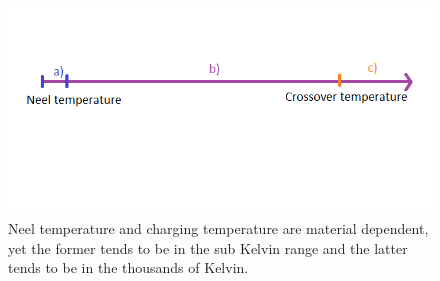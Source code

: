 \begin{figure}[htbp]
\begin{center}
\includegraphics[scale=.50]{temperature.png}
\caption{Neel temperature and charging temperature are material dependent, yet the former tends to be in the sub Kelvin range and the latter tends to be in the thousands of Kelvin.}
\label{temperature}
\end{center}
\end{figure}

